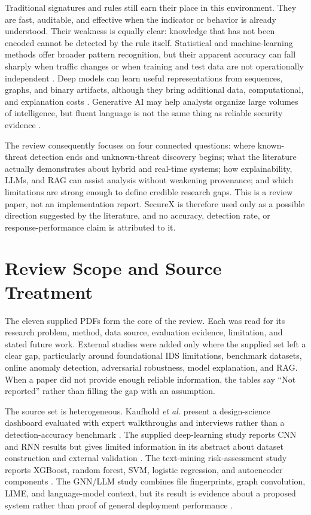 \documentclass[conference]{IEEEtran}
\begin{document}
Traditional signatures and rules still earn their place in this environment. They are fast, auditable, and effective when the indicator or behavior is already understood. Their weakness is equally clear: knowledge that has not been encoded cannot be detected by the rule itself. Statistical and machine-learning methods offer broader pattern recognition, but their apparent accuracy can fall sharply when traffic changes or when training and test data are not operationally independent \cite{SommerPaxson,BuczakGuven,Liao2013,Arp2022}. Deep models can learn useful representations from sequences, graphs, and binary artifacts, although they bring additional data, computational, and explanation costs \cite{Shone2018}. Generative AI may help analysts organize large volumes of intelligence, but fluent language is not the same thing as reliable security evidence \cite{Lewis2020,Liu2025}.

The review consequently focuses on four connected questions: where known-threat detection ends and unknown-threat discovery begins; what the literature actually demonstrates about hybrid and real-time systems; how explainability, LLMs, and RAG can assist analysis without weakening provenance; and which limitations are strong enough to define credible research gaps. This is a review paper, not an implementation report. SecureX is therefore used only as a possible direction suggested by the literature, and no accuracy, detection rate, or response-performance claim is attributed to it.

\section{Review Scope and Source Treatment}
The eleven supplied PDFs form the core of the review. Each was read for its research problem, method, data source, evaluation evidence, limitation, and stated future work. External studies were added only where the supplied set left a clear gap, particularly around foundational IDS limitations, benchmark datasets, online anomaly detection, adversarial robustness, model explanation, and RAG. When a paper did not provide enough reliable information, the tables say ``Not reported'' rather than filling the gap with an assumption.

The source set is heterogeneous. Kaufhold \emph{et al.} present a design-science dashboard evaluated with expert walkthroughs and interviews rather than a detection-accuracy benchmark \cite{Kaufhold2022}. The supplied deep-learning study reports CNN and RNN results but gives limited information in its abstract about dataset construction and external validation \cite{Rajendran2024}. The text-mining risk-assessment study reports XGBoost, random forest, SVM, logistic regression, and autoencoder components \cite{KumarBhatRisk}. The GNN/LLM study combines file fingerprints, graph convolution, LIME, and language-model context, but its result is evidence about a proposed system rather than proof of general deployment performance \cite{Balaji2025}.
\end{document}
